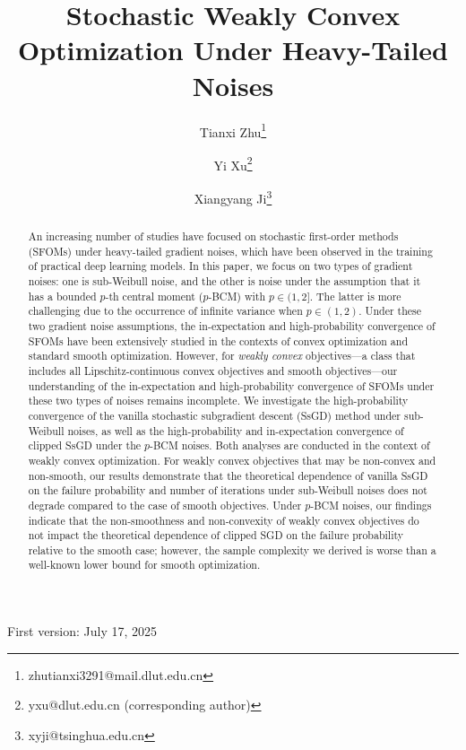 \documentclass{article}
\begin{document}
\title{\bf Stochastic Weakly Convex Optimization Under Heavy-Tailed Noises}
\author[1,2]{Tianxi Zhu\thanks{zhutianxi3291@mail.dlut.edu.cn}}
\author[1]{Yi Xu\thanks{yxu@dlut.edu.cn (corresponding author)}}
\author[3]{Xiangyang Ji\thanks{xyji@tsinghua.edu.cn}}
\date{}
\maketitle
\vspace*{-0.5in}
\begin{center}
   First version: July 17, 2025 
\end{center}



\begin{abstract}
An increasing number of studies have focused on stochastic first-order methods (SFOMs) under heavy-tailed gradient noises, which have been observed in the training of practical deep learning models. In this paper, we focus on two types of gradient noises: one is sub-Weibull noise, and the other is noise under the assumption that it has a bounded \( p \)-th central moment ($p$-BCM) with \( p \in (1, 2] \). The latter is more challenging due to the occurrence of infinite variance when \( p \in (1, 2) \). Under these two gradient noise assumptions, the in-expectation and high-probability convergence of SFOMs have been extensively studied in the contexts of convex optimization and standard smooth optimization. However, for \textit{weakly convex} objectives—a class that includes all Lipschitz-continuous convex objectives and smooth objectives—our understanding of the in-expectation and high-probability convergence of SFOMs under these two types of noises remains incomplete. We investigate the high-probability convergence of the vanilla stochastic subgradient descent (SsGD) method under sub-Weibull noises, as well as the high-probability and in-expectation convergence of clipped SsGD under the $p$-BCM noises. Both analyses are conducted in the context of weakly convex optimization. For weakly convex objectives that may be non-convex and non-smooth, our results demonstrate that the theoretical dependence of vanilla SsGD on the failure probability and number of iterations under sub-Weibull noises does not degrade compared to the case of smooth objectives. Under \( p \)-BCM noises, our findings indicate that the non-smoothness and non-convexity of weakly convex objectives do not impact the theoretical dependence of clipped SGD on the failure probability relative to the smooth case; however, the sample complexity we derived is worse than a well-known lower bound for smooth optimization. 
\end{abstract}
\end{document}
